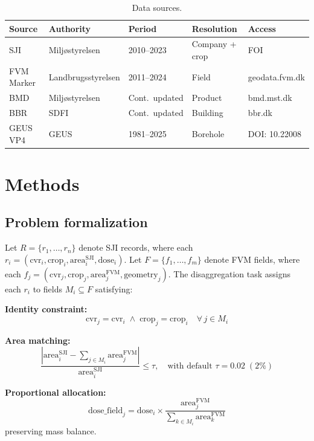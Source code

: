\documentclass[12pt,a4paper]{article}
\begin{document}
\begin{table}[H]
\centering
\caption{Data sources.}
\label{tab:datasources}
\footnotesize
\begin{tabular}{@{}lllll@{}}
\toprule
Source & Authority & Period & Resolution & Access \\
\midrule
SJI & Milj\o styrelsen & 2010--2023 & Company + crop & FOI \\
FVM Marker & Landbrugsstyrelsen & 2011--2024 & Field & geodata.fvm.dk \\
BMD & Milj\o styrelsen & Cont.\ updated & Product & bmd.mst.dk \\
BBR & SDFI & Cont.\ updated & Building & bbr.dk \\
GEUS VP4 & GEUS & 1981--2025 & Borehole & DOI: 10.22008 \\
\bottomrule
\end{tabular}
\end{table}

\section{Methods}

\subsection{Problem formalization}

Let $R = \{r_1, \ldots, r_n\}$ denote SJI records, where each $r_i = (\text{cvr}_i, \text{crop}_i, \text{area}_i^{\text{SJI}}, \text{dose}_i)$. Let $F = \{f_1, \ldots, f_m\}$ denote FVM fields, where each $f_j = (\text{cvr}_j, \text{crop}_j, \text{area}_j^{\text{FVM}}, \text{geometry}_j)$. The disaggregation task assigns each $r_i$ to fields $M_i \subseteq F$ satisfying:

\medskip
\noindent\textbf{Identity constraint:}
\begin{equation}
\text{cvr}_j = \text{cvr}_i \;\wedge\; \text{crop}_j = \text{crop}_i \quad \forall\, j \in M_i
\end{equation}

\noindent\textbf{Area matching:}
\begin{equation}
\frac{|\text{area}_i^{\text{SJI}} - \sum_{j \in M_i} \text{area}_j^{\text{FVM}}|}{\text{area}_i^{\text{SJI}}} \leq \tau, \quad \text{with default } \tau = 0.02 \; (2\%)
\end{equation}

\noindent\textbf{Proportional allocation:}
\begin{equation}
\text{dose\_field}_j = \text{dose}_i \times \frac{\text{area}_j^{\text{FVM}}}{\sum_{k \in M_i} \text{area}_k^{\text{FVM}}}
\end{equation}
preserving mass balance.
\end{document}
